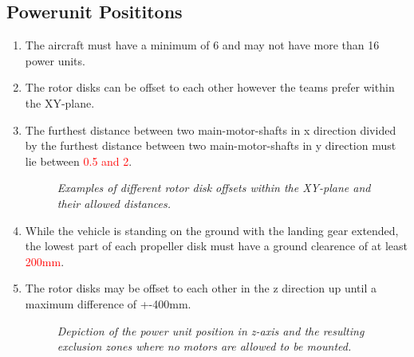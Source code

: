 \documentclass{article}
\begin{document}
\subsection{Powerunit Posititons}
\begin{enumerate}
  \item The aircraft must have a minimum of 6 and may not have more than 16 power units. 
  \item The rotor disks can be offset to each other however the teams prefer within the XY-plane. 
  \item The furthest distance between two main-motor-shafts in x direction divided by the furthest distance between two main-motor-shafts in y direction must lie between \textcolor{red}{0.5 and 2}. 
  
  \begin{figure}[h!]
    \centering
   \caption{\textit{Examples of different rotor disk offsets within the XY-plane and their allowed distances.}}
   \end{figure}

  \item While the vehicle is standing on the ground with the landing gear extended, the lowest part of each propeller disk must have a ground clearence of at least \textcolor{red}{200mm}. 
  \item The rotor disks may be offset to each other in the z direction up until a maximum difference of +-400mm.
  
  \begin{figure}[h!]
    \centering
   \caption{\textit{Depiction of the power unit position in z-axis and the resulting exclusion zones where no motors are allowed to be mounted.}}
   \end{figure}


\end{enumerate}
\end{document}
